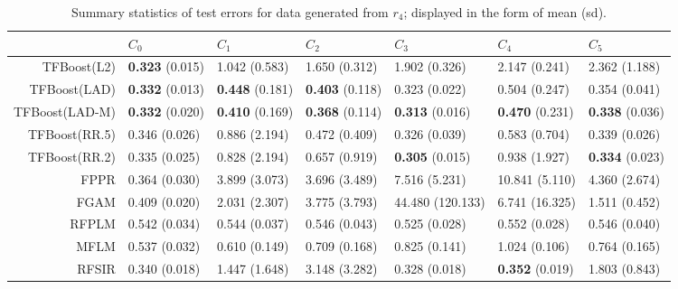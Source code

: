 \begin{table}[H]
\centering
\footnotesize
\begin{tabular}{rllllll}
  \hline
 & $C_0$ & $C_1$ & $C_2$ & $C_3$ & $C_4$ & $C_5$ \\ 
  \hline
TFBoost(L2) & \textbf{0.323} (0.015) & 1.042 (0.583) & 1.650 (0.312) & 1.902 (0.326) & 2.147 (0.241) & 2.362 (1.188) \\ 
  TFBoost(LAD) & \textbf{0.332} (0.013) & \textbf{0.448} (0.181) & \textbf{0.403} (0.118) & 0.323 (0.022) & 0.504 (0.247) & 0.354 (0.041) \\ 
  TFBoost(LAD-M) & \textbf{0.332} (0.020) & \textbf{0.410} (0.169) & \textbf{0.368} (0.114) & \textbf{0.313} (0.016) & \textbf{0.470} (0.231) & \textbf{0.338} (0.036) \\ 
  TFBoost(RR.5) & 0.346 (0.026) & 0.886 (2.194) & 0.472 (0.409) & 0.326 (0.039) & 0.583 (0.704) & 0.339 (0.026) \\ 
  TFBoost(RR.2) & 0.335 (0.025) & 0.828 (2.194) & 0.657 (0.919) & \textbf{0.305} (0.015) & 0.938 (1.927) & \textbf{0.334} (0.023) \\ 
  FPPR & 0.364 (0.030) & 3.899 (3.073) & 3.696 (3.489) & 7.516 (5.231) & 10.841 (5.110) & 4.360 (2.674) \\ 
  FGAM & 0.409 (0.020) & 2.031 (2.307) & 3.775 (3.793) & 44.480 (120.133) & 6.741 (16.325) & 1.511 (0.452) \\ 
  RFPLM & 0.542 (0.034) & 0.544 (0.037) & 0.546 (0.043) & 0.525 (0.028) & 0.552 (0.028) & 0.546 (0.040) \\ 
  MFLM & 0.537 (0.032) & 0.610 (0.149) & 0.709 (0.168) & 0.825 (0.141) & 1.024 (0.106) & 0.764 (0.165) \\ 
  RFSIR & 0.340 (0.018) & 1.447 (1.648) & 3.148 (3.282) & 0.328 (0.018) & \textbf{0.352} (0.019) & 1.803 (0.843) \\ 
   \hline
\end{tabular}
\caption{Summary statistics of test errors for data generated from $r_4$; displayed in the form of mean (sd).} 
\end{table}
